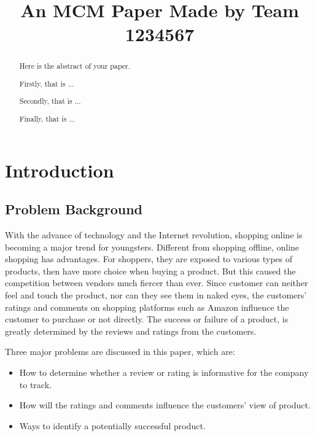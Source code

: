 \documentclass[12pt]{article}  %
\title{An MCM Paper Made by Team 1234567}  %
\begin{document}
\begin{abstract}
    Here is the abstract of your paper.

    Firstly, that is ...

    Secondly, that is ...

    Finally, that is ...


\end{abstract}

\maketitle  %
\tableofcontents  %


\section{Introduction}
\subsection{Problem Background}
With the advance of technology and the Internet revolution, shopping online is becoming a major trend for youngsters. Different from shopping offline, online shopping has advantages. For shoppers, they are exposed to various types of products, then have more choice when buying a product. But this caused the competition between vendors much fiercer than ever. Since customer can neither feel and touch the product, nor can they see them in naked eyes, the customers' ratings and comments on shopping platforms such as Amazon influence the customer to purchase or not directly. The success or failure of a product, is greatly determined by the reviews and ratings from the customers.

Three major problems are discussed in this paper, which are:
\begin{itemize}
    \item How to determine whether a review or rating is informative for the company to track.
    \item How will the ratings and comments influence the customers' view of product.
    \item Ways to identify a potentially successful product.
      
\end{itemize}
\end{document}
